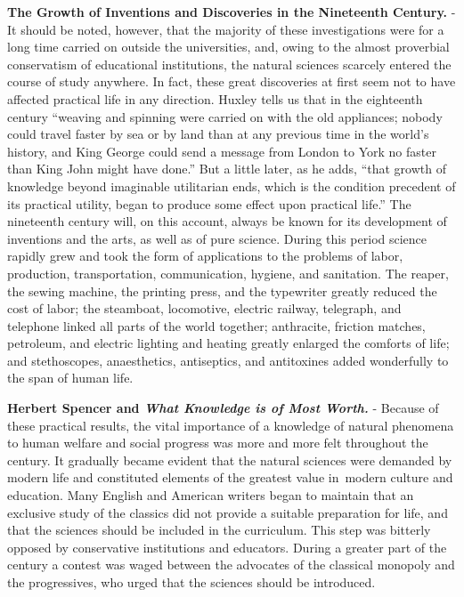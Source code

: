 \documentclass[
]{book}
\begin{document}
\textbf{The Growth of Inventions and Discoveries in the Nineteenth Century.} - It should be noted, however, that the majority of these investigations were for a long time carried on outside the universities, and, owing to the almost proverbial conservatism of educational institutions, the natural sciences scarcely entered the course of study anywhere. In fact, these great discoveries at first seem not to have affected practical life in any direction. Huxley tells us that in the eighteenth century ``weaving and spinning were carried on with the old appliances; nobody could travel faster by sea or by land than at any previous time in the world's history, and King George could send a message from London to York no faster than King John might have done.'' But a little later, as he adds, ``that growth of knowledge beyond imaginable utilitarian ends, which is the condition precedent of its practical utility, began to produce some effect upon practical life.'' The nineteenth century will, on this account, always be known for its development of inventions and the arts, as well as of pure science. During this period science rapidly grew and took the form of applications to the problems of labor, production, transportation, communication, hygiene, and sanitation. The reaper, the sewing machine, the printing press, and the typewriter greatly reduced the cost of labor; the steamboat, locomotive, electric railway, telegraph, and telephone linked all parts of the world together; anthracite, friction matches, petroleum, and electric lighting and heating greatly enlarged the comforts of life; and stethoscopes, anaesthetics, antiseptics, and antitoxines added wonderfully to the span of human life.

\textbf{Herbert Spencer and \emph{What Knowledge is of Most Worth.}} - Because of these practical results, the vital importance of a knowledge of natural phenomena to human welfare and social progress was more and more felt throughout the century. It gradually became evident that the natural sciences were demanded by modern life and constituted elements of the greatest value in~modern culture and education. Many English and American writers began to maintain that an exclusive study of the classics did not provide a suitable preparation for life, and that the sciences should be included in the curriculum. This step was bitterly opposed by conservative institutions and educators. During a greater part of the century a contest was waged between the advocates of the classical monopoly and the progressives, who urged that the sciences should be introduced.
\end{document}
